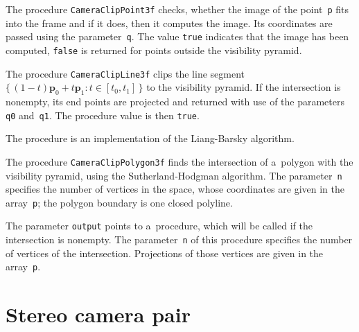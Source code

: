 \vspace{\bigskipamount}
The procedure \texttt{CameraClipPoint3f} checks, whether the image
of the point~\texttt{p} fits into the frame and if it does, then it
computes the image. Its coordinates are passed using the
parameter~\texttt{q}.
The value \texttt{true} indicates that the image has been computed,
\texttt{false} is returned for points outside the visibility pyramid.

\vspace{\bigskipamount}
The procedure \texttt{CameraClipLine3f} clips the line segment
$\{\,(1-t)\bm{p}_0+t\bm{p}_1\colon t\in[t_0,t_1]\,\}$ to the visibility
pyramid.
If the intersection is nonempty, its end points are projected and returned
with use of the parameters
\texttt{q0} and~\texttt{q1}. The procedure value is then \texttt{true}.

The procedure is an implementation of the Liang-Barsky algorithm.

\vspace{\bigskipamount}
The procedure \texttt{CameraClipPolygon3f} finds the intersection of
a~polygon with the visibility pyramid, using the Sutherland-Hodgman 
algorithm.
The parameter~\texttt{n} specifies the number of vertices in the space,
whose coordinates are given in the array~\texttt{p}; the polygon boundary
is one closed polyline.

\begin{sloppypar}
The parameter \texttt{output} points to a~procedure, which will be called if
the intersection is nonempty. The parameter~\texttt{n} of this procedure
specifies the number of vertices of the intersection. Projections of those
vertices are given in the array~\texttt{p}.%
\end{sloppypar}



\newpage
\section{Stereo camera pair}

